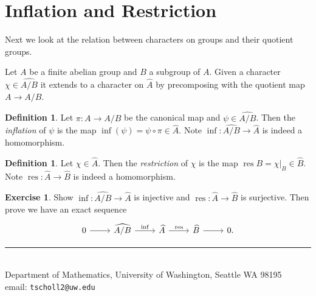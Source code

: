 \documentclass[11pt]{article}
\makeatletter
\newcommand{\res}{\operatorname{res}}
\renewcommand{\hat}{\widehat}
\theoremstyle{plain}
\theoremstyle{definition}
\newtheorem{defn}[definitionCounter]{Definition}
\newtheorem{excer}[exerciseCounter]{Exercise}
\theoremstyle{remark}
\newcommand{\myauthor}{Travis Scholl}
\newcommand{\myemail}{tscholl2@uw.edu}
\makeatother
\begin{document}
\section{Inflation and Restriction}


Next we look at the relation between characters on groups and their quotient groups.

Let $A$ be a finite abelian group and $B$ a subgroup of $A$. Given a character $\chi\in\hat{A/B}$ it extends to a character on $\hat{A}$ by precomposing with the quotient map $A \to A/B$.

\begin{defn}\label{def:inflation}
	Let $\pi:A \to A/B$ be the canonical map and $\psi\in\hat{A/B}$. Then the \emph{inflation} of $\psi$ is the map $\inf(\psi) = \psi\circ\pi \in \hat{A}$. Note $\inf:\hat{A/B} \to\hat{A}$ is indeed a homomorphism.
\end{defn}

\begin{defn}\label{def:restriction}
	Let $\chi\in\hat{A}$. Then the \emph{restriction} of $\chi$ is the map $\res{B} = \chi|_B\in\hat{B}$. Note $\res:\hat{A} \to \hat{B}$ is indeed a homomorphism.
\end{defn}

\begin{excer}
	Show $\inf:\hat{A/B} \to\hat{A}$ is injective and $\res:\hat{A}\to\hat{B}$ is surjective. Then prove we have an exact sequence
	$$
	\begin{tikzcd}
		0 \rar & \hat{A/B} \rar{\inf} & \hat{A} \rar{\res} & \hat{B} \rar & 0.
	\end{tikzcd}
	$$
\end{excer}






\begin{center}
\noindent\rule{4cm}{.5pt}
\vspace{.25cm}

\noindent {\sc \small \myauthor}\\
{\small Department of Mathematics, University of Washington, Seattle WA 98195} \\
email: {\tt \myemail}
\end{center}
\end{document}
